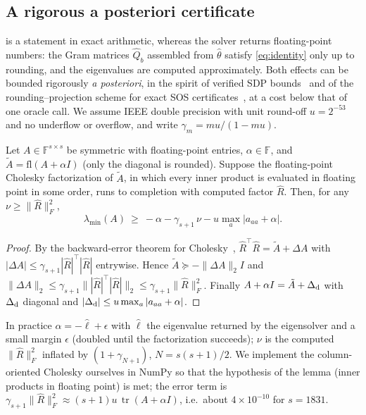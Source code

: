 \documentclass[a4paper,11pt]{article}
\theoremstyle{plain}
\theoremstyle{definition}
\theoremstyle{remark}
\newcommand{\tr}{\operatorname{tr}}
\newcommand{\lmin}{\lambda_{\min}}
\begin{document}
\subsection{A rigorous a posteriori certificate}\label{sec:rigor}
 is a statement in exact arithmetic, whereas the solver returns floating-point numbers: the Gram matrices $\hat Q_b$ assembled from $\hat\theta$ satisfy \eqref{eq:identity} only up to rounding, and the eigenvalues are computed approximately. Both effects can be bounded rigorously \emph{a posteriori}, in the spirit of verified SDP bounds~\cite{jansson2008} and of the rounding--projection scheme for exact SOS certificates~\cite{peyrl2008}, at a cost below that of one oracle call. We assume IEEE double precision with unit round-off $u=2^{-53}$ and no underflow or overflow, and write $\gamma_m=mu/(1-mu)$.

\begin{lemma}[verified lower bound on $\lmin$]\label{lem:chol}
Let $A\in\mathbb F^{s\times s}$ be symmetric with floating-point entries, $\alpha\in\mathbb F$, and $\tilde A=\mathrm{fl}(A+\alpha I)$ (only the diagonal is rounded). Suppose the floating-point Cholesky factorization of $\tilde A$, in which every inner product is evaluated in floating point in some order, runs to completion with computed factor $\hat R$. Then, for any $\nu\ge\|\hat R\|_F^2$,
\[
\lmin(A)\ \ge\ -\alpha-\gamma_{s+1}\,\nu-u\max_a|a_{aa}+\alpha| .
\]
\end{lemma}
\begin{proof}
By the backward-error theorem for Cholesky~\cite[Thm.~10.3]{higham2002}, $\hat R^\top\hat R=\tilde A+\Delta A$ with $|\Delta A|\le\gamma_{s+1}|\hat R|^\top|\hat R|$ entrywise. Hence $\tilde A\succeq-\|\Delta A\|_2I$ and $\|\Delta A\|_2\le\gamma_{s+1}\||\hat R|^\top|\hat R|\|_2\le\gamma_{s+1}\|\hat R\|_F^2$. Finally $A+\alpha I=\tilde A+\Delta_{\rm d}$ with $\Delta_{\rm d}$ diagonal and $|\Delta_{\rm d}|\le u\max_a|a_{aa}+\alpha|$.
\end{proof}
In practice $\alpha=-\hat\ell+\epsilon$ with $\hat\ell$ the eigenvalue returned by the eigensolver and a small margin $\epsilon$ (doubled until the factorization succeeds); $\nu$ is the computed $\|\hat R\|_F^2$ inflated by $(1+\gamma_{N+1})$, $N=s(s+1)/2$. We implement the column-oriented Cholesky ourselves in NumPy so that the hypothesis of the lemma (inner products in floating point) is met; the error term is $\gamma_{s+1}\|\hat R\|_F^2\approx(s+1)u\,\tr(A+\alpha I)$, i.e.\ about $4\times10^{-10}$ for $s=1831$.
\end{document}
